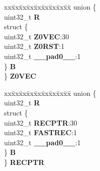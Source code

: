 \begin{DoxyCompactItemize}
\begin{tabbing}
\end{tabbing}\item 
\mbox{\label{structCRP__tag_ac05e6ab6d751a0111d9b48790ad392b5}} 
\begin{tabbing}
xx\=xx\=xx\=xx\=xx\=xx\=xx\=xx\=xx\=\kill
union \{\\
\>uint32\_t {\bfseries R}\\
\>struct \{\\
\>\>uint32\_t {\bfseries Z0VEC}:30\\
\>\>uint32\_t {\bfseries Z0RST}:1\\
\>\>uint32\_t {\bfseries \_\_pad0\_\_}:1\\
\>\} {\bfseries B}\\
\} {\bfseries Z0VEC}\\

\end{tabbing}\item 
\mbox{\label{structCRP__tag_a6855d9ab5f0ac472d7d34625b3b1105c}} 
\begin{tabbing}
xx\=xx\=xx\=xx\=xx\=xx\=xx\=xx\=xx\=\kill
union \{\\
\>uint32\_t {\bfseries R}\\
\>struct \{\\
\>\>uint32\_t {\bfseries RECPTR}:30\\
\>\>uint32\_t {\bfseries FASTREC}:1\\
\>\>uint32\_t {\bfseries \_\_pad0\_\_}:1\\
\>\} {\bfseries B}\\
\} {\bfseries RECPTR}\\


\end{tabbing}
\end{DoxyCompactItemize}
